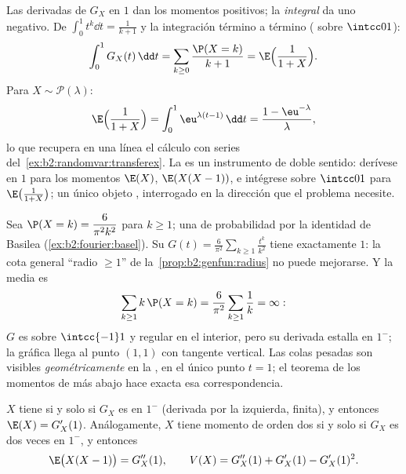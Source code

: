\begin{example}\label{ex:b2:genfun:integraltrick}
Las derivadas de $G_X$ en $1$ dan los momentos positivos; la
\emph{integral} da uno negativo. De $\int_0^1t^k\dd t = \frac1{k+1}$
y la integración término a término ( sobre
$\intcc01$):
\[
\int_0^1G_X(t)\,\dd t = \sum_{k\geq0}\frac{\P(X =
k)}{k+1} = \E\Bigl(\frac1{1+X}\Bigr).
\]
Para $X \sim \mathcal P(\lambda)$:
\[
\E\Bigl(\frac1{1+X}\Bigr) =
\int_0^1\eu^{\lambda(t-1)}\,\dd t = \frac{1 -
\eu^{-\lambda}}{\lambda},
\]
lo que recupera en una línea el cálculo con series del~\cref{ex:b2:randomvar:transferex}. La  es un
instrumento de doble sentido: derívese en $1$ para los momentos
$\E(X)$, $\E(X(X-1))$, e intégrese sobre $\intcc01$ para
$\E\bigl(\frac1{1+X}\bigr)$; un único objeto , interrogado
en la dirección que el problema necesite.
\end{example}

\begin{example}\label{ex:b2:genfun:heavytail}
Sea $\P(X = k) = \dfrac{6}{\pi^2k^2}$ para $k \geq 1$; una  de
probabilidad por la identidad de Basilea
(\cref{ex:b2:fourier:basel}). Su  $G(t) =
\frac6{\pi^2}\sum_{k\geq1}\frac{t^k}{k^2}$ tiene
 exactamente $1$: la cota general ``radio $\geq
1$'' de la~\cref{prop:b2:genfun:radius} no puede mejorarse. Y la
media es
\[
\sum_{k\geq1}k\,\P(X = k) =
\frac6{\pi^2}\sum_{k\geq1}\frac1k = \infty :
\]
$G$ es  sobre $\intcc{-1}1$ y regular en el interior, pero su
derivada estalla en $1^-$; la gráfica llega al punto $(1, 1)$ con
tangente vertical. Las colas pesadas son visibles
\emph{geométricamente} en la , en el único punto $t
= 1$; el teorema de los momentos de más abajo hace exacta esa
correspondencia.
\end{example}

\begin{theorem}\label{thm:b2:genfun:moments}
$X$ tiene  si y solo si $G_X$ es  en $1^-$
(derivada por la izquierda, finita), y entonces $\E(X) = G_X'(1)$.
Análogamente, $X$ tiene momento de orden dos si y solo si $G_X$ es
dos veces  en $1^-$, y entonces
\[
\E\bigl(X(X - 1)\bigr) = G_X''(1),
\qquad
V(X) = G_X''(1) + G_X'(1) - G_X'(1)^2 .
\]
\end{theorem}

